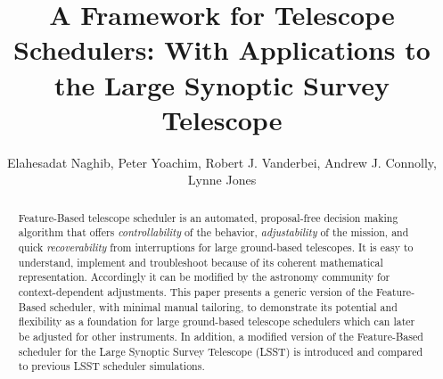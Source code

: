 \documentclass[12pt]{aastex62}
\theoremstyle{definition}
\begin{document}
\title{A Framework for Telescope Schedulers: With Applications to the Large Synoptic Survey Telescope}
\author{Elahesadat Naghib, Peter Yoachim, Robert J. Vanderbei, Andrew J. Connolly, Lynne Jones}


\begin{abstract}
Feature-Based telescope scheduler is an automated, proposal-free decision making algorithm that offers \textit{controllability} of the behavior, \textit{adjustability} of the mission, and quick \textit{recoverability} from interruptions for large ground-based telescopes. It is easy to understand, implement and troubleshoot because of its coherent mathematical representation. Accordingly it can be modified by the astronomy community for context-dependent adjustments. This paper presents a generic version of the Feature-Based scheduler, with minimal manual tailoring, to demonstrate its potential and flexibility as a foundation for large ground-based telescope schedulers which can later be adjusted for other instruments. In addition, a modified version of the Feature-Based scheduler for the Large Synoptic Survey Telescope (LSST) is introduced and compared to previous LSST scheduler simulations.
\end{abstract}
\end{document}

